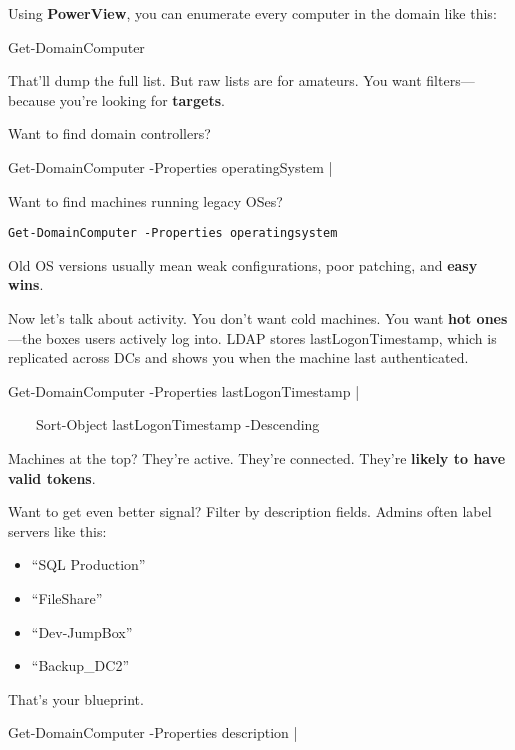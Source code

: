Using \textbf{PowerView}, you can enumerate every computer in the domain like this:


Get-DomainComputer

That’ll dump the full list. But raw lists are for amateurs. You want filters—because you’re looking for \textbf{targets}.

Want to find domain controllers?

Get-DomainComputer -Properties operatingSystem |


Want to find machines running legacy OSes?

\texttt{Get-DomainComputer -Properties operatingsystem}


Old OS versions usually mean weak configurations, poor patching, and \textbf{easy wins}.

Now let’s talk about activity. You don’t want cold machines. You want \textbf{hot ones}—the boxes users actively log into. LDAP stores lastLogonTimestamp, which is replicated across DCs and shows you when the machine last authenticated.


Get-DomainComputer -Properties lastLogonTimestamp |


    Sort-Object lastLogonTimestamp -Descending

Machines at the top? They’re active. They’re connected. They’re \textbf{likely to have valid tokens}.

Want to get even better signal? Filter by description fields. Admins often label servers like this:

\begin{itemize}
    \item “SQL Production”

    \item “FileShare”

    \item “Dev-JumpBox”

    \item “Backup\_DC2”

\end{itemize}
That’s your blueprint.

Get-DomainComputer -Properties description |

